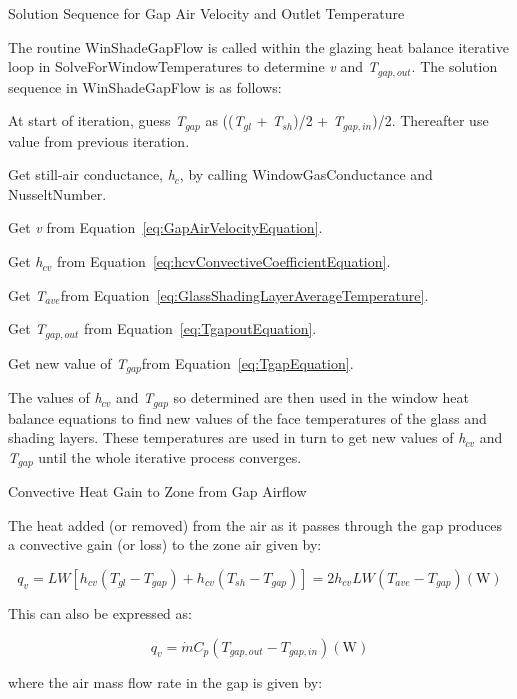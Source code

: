 Solution Sequence for Gap Air Velocity and Outlet Temperature

The routine WinShadeGapFlow is called within the glazing heat balance iterative loop in SolveForWindowTemperatures to determine \emph{v} and \emph{T\(_{gap,out}\)}. The solution sequence in WinShadeGapFlow is as follows:

At start of iteration, guess \emph{T\(_{gap}\)} as ((\emph{T\(_{gl}\)} + \emph{T\(_{sh}\)})/2 + \emph{T\(_{gap,in}\)})/2. Thereafter use value from previous iteration.

Get still-air conductance, \emph{h\(_{c}\)}, by calling WindowGasConductance and NusseltNumber.

Get \emph{v} from Equation~\ref{eq:GapAirVelocityEquation}.

Get \emph{h\(_{cv}\)} from Equation~\ref{eq:hcvConvectiveCoefficientEquation}.

Get \emph{T\(_{ave}\)}from Equation~\ref{eq:GlassShadingLayerAverageTemperature}.

Get \emph{T\(_{gap,out}\)} from Equation~\ref{eq:TgapoutEquation}.

Get new value of \emph{T\(_{gap}\)}from Equation~\ref{eq:TgapEquation}.

The values of \emph{h\(_{cv}\)} and \emph{T\(_{gap}\)} so determined are then used in the window heat balance equations to find new values of the face temperatures of the glass and shading layers. These temperatures are used in turn to get new values of \emph{h\(_{cv}\)} and \emph{T\(_{gap}\)} until the whole iterative process converges.

Convective Heat Gain to Zone from Gap Airflow

The heat added (or removed) from the air as it passes through the gap produces a convective gain (or loss) to the zone air given by:

\begin{equation}
{q_v} = LW\left[ {{h_{cv}}\left( {{T_{gl}} - {T_{gap}}} \right) + {h_{cv}}\left( {{T_{sh}} - {T_{gap}}} \right)} \right] = 2{h_{cv}}LW\left( {{T_{ave}} - {T_{gap}}} \right){\mathrm{    (W)}}
\end{equation}

This can also be expressed as:

\begin{equation}
{q_v} = \dot m{C_p}\left( {{T_{gap,out}} - {T_{gap,in}}} \right){\mathrm{    (W)}}
\end{equation}

where the air mass flow rate in the gap is given by:

